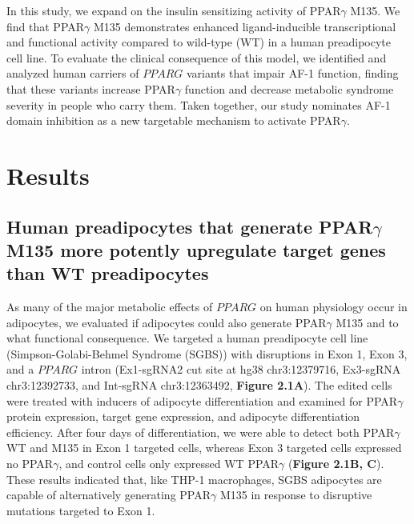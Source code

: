 In this study, we expand on the insulin sensitizing activity of PPAR$\gamma$ M135. We find that PPAR$\gamma$ M135 demonstrates enhanced ligand-inducible transcriptional and functional activity compared to wild-type (WT) in a human preadipocyte cell line. To evaluate the clinical consequence of this model, we identified and analyzed human carriers of \(PPARG\) variants that impair AF-1 function, finding that these variants increase PPAR$\gamma$ function and decrease metabolic syndrome severity in people who carry them. Taken together, our study nominates AF-1 domain inhibition as a new targetable mechanism to activate PPAR$\gamma$.

\section{Results}

\subsection{Human preadipocytes that generate PPAR\texorpdfstring{$\gamma$}{gamma} M135 more potently upregulate target genes than WT preadipocytes}

As many of the major metabolic effects of \(PPARG\) on human physiology occur in adipocytes\cite{Majithia2014-op}, we evaluated if adipocytes could also generate PPAR$\gamma$ M135 and to what functional consequence. We targeted a human preadipocyte cell line (Simpson-Golabi-Behmel Syndrome (SGBS)\cite{Wabitsch2001-fx}) with disruptions in Exon 1, Exon 3, and a \(PPARG\) intron (Ex1-sgRNA2 cut site at hg38 chr3:12379716, Ex3-sgRNA chr3:12392733, and Int-sgRNA chr3:12363492, \textbf{Figure 2.1A}). The edited cells were treated with inducers of adipocyte differentiation and examined for PPAR$\gamma$ protein expression, target gene expression, and adipocyte differentiation efficiency. After four days of differentiation, we were able to detect both PPAR$\gamma$ WT and M135 in Exon 1 targeted cells, whereas Exon 3 targeted cells expressed no PPAR$\gamma$, and control cells only expressed WT PPAR$\gamma$ (\textbf{Figure 2.1B, C}). These results indicated that, like THP-1 macrophages, SGBS adipocytes are capable of alternatively generating PPAR$\gamma$ M135 in response to disruptive mutations targeted to Exon 1.

